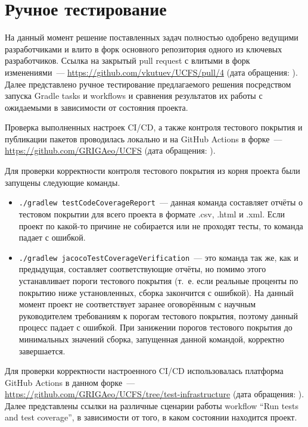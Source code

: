\documentclass[a4paper]{article}
\begin{document}
\section{Ручное тестирование}
На данный момент решение поставленных задач полностью одобрено ведущими разработчиками и влито в форк основного репозитория одного из ключевых разработчиков. Ссылка на закрытый pull request с влитыми в форк изменениями~--- \url{https://github.com/vkutuev/UCFS/pull/4} (дата обращения: ). Далее представлено ручное тестирование предлагаемого решения посредством запуска Gradle tasks и workflows и сравнения результатов их работы с ожидаемыми в зависимости от состояния проекта.

Проверка выполненных настроек CI/CD, а также контроля тестового покрытия и публикации пакетов проводилась локально и на GitHub Actions в форке~--- \url{https://github.com/GRIGAeo/UCFS} (дата обращения: ).

Для проверки корректности контроля тестового покрытия из корня проекта были запущены следующие команды.
\begin{itemize}
    \item \verb|./gradlew testCodeCoverageReport|~--- данная команда составляет отчёты о тестовом покрытии для всего проекта в формате .csv, .html и .xml. Если проект по какой-то причине не собирается или не проходят тесты, то команда падает с ошибкой.
    \item \verb|./gradlew jacocoTestCoverageVerification|~--- это команда так же, как и предыдущая, составляет соответствующие отчёты, но помимо этого устанавливает пороги тестового покрытия (т.~е. если реальные проценты по покрытию ниже установленных, сборка закончится с ошибкой). На данный момент проект не соответствует заранее оговорённым с научным руководителем требованиям к порогам тестового покрытия, поэтому данный процесс падает с ошибкой. При занижении порогов тестового покрытия до минимальных значений сборка, запущенная данной командой, корректно завершается.
\end{itemize}

Для проверки корректности настроенного CI/CD использовалась платформа GitHub Actions в данном форке~--- \url{https://github.com/GRIGAeo/UCFS/tree/test-infrastructure} (дата обращения: ). Далее представлены ссылки на различные сценарии работы workflow \foreignquote{english}{Run tests and test coverage}, в зависимости от того, в каком состоянии находится проект.
\end{document}
